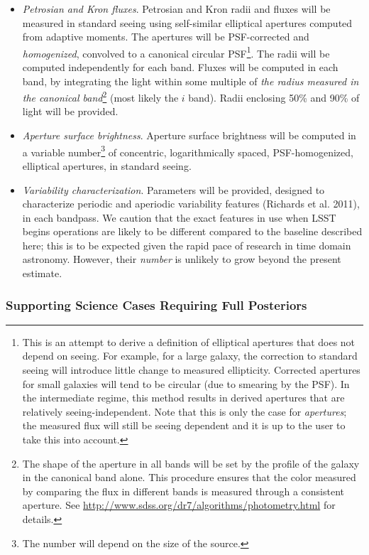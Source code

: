 \documentclass[12pt]{article}
\begin{document}
\begin{itemize}
    \item {\em Petrosian and Kron fluxes}. Petrosian and Kron radii and fluxes will be measured in standard seeing using self-similar elliptical apertures computed from adaptive moments. The apertures will be PSF-corrected and {\em homogenized}, convolved to a canonical circular PSF\footnote{This is an attempt to derive a definition of elliptical apertures that does not depend on seeing. For example, for a large galaxy, the correction to standard seeing will introduce little change to measured ellipticity. Corrected apertures for small galaxies will tend to be circular (due to smearing by the PSF). In the intermediate regime, this method results in derived apertures that are relatively seeing-independent. Note that this is only the case for {\em apertures}; the measured flux will still be seeing dependent and it is up to the user to take this into account.}. The radii will be computed independently for each band. Fluxes will be computed in each band, by integrating the light within some multiple of {\em the radius measured in the canonical band}\footnote{The shape of the aperture in all bands will be set by the profile of the galaxy in the canonical band alone. This procedure ensures that the color measured by comparing the flux in different bands is measured through a consistent aperture. See \url{http://www.sdss.org/dr7/algorithms/photometry.html} for details.} (most likely the $i$ band). Radii enclosing 50\% and 90\% of light will be provided.
    \item {\em Aperture surface brightness}. Aperture surface brightness will be computed in a variable number\footnote{The number will depend on the size of the source.} of concentric, logarithmically spaced, PSF-homogenized, elliptical apertures, in standard seeing.
\item {\em Variability characterization}. Parameters will be provided, designed to characterize periodic and aperiodic variability features (Richards et al. 2011), in each bandpass.
We caution that the exact features in use when LSST begins operations are likely to be different compared to the baseline described here; this is to be expected given the rapid pace of research in time domain astronomy. However, their {\em number} is unlikely to grow beyond the present estimate.
\end{itemize}

\subsubsection{Supporting Science Cases Requiring Full Posteriors}
\end{document}
